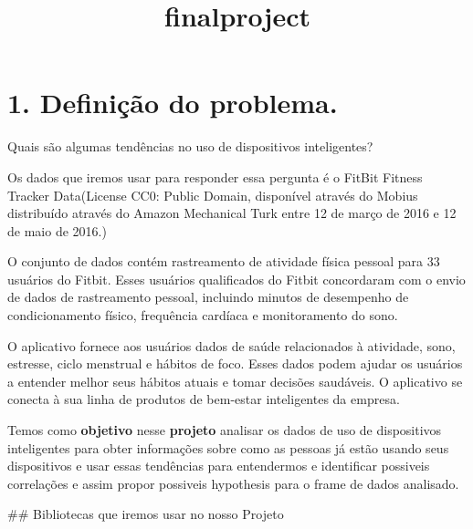 \documentclass[11pt]{article}
\title{finalproject}
\begin{document}
\maketitle
\tableofcontents





\section{1. Definição do problema.}

Quais são algumas tendências no uso de dispositivos inteligentes?

Os dados que iremos usar para responder essa pergunta é o FitBit Fitness
Tracker Data(License CC0: Public Domain, disponível através do Mobius
distribuído através do Amazon Mechanical Turk entre 12 de março de 2016
e 12 de maio de 2016.)

O conjunto de dados contém rastreamento de atividade física pessoal para
33 usuários do Fitbit. Esses usuários qualificados do Fitbit concordaram
com o envio de dados de rastreamento pessoal, incluindo minutos de
desempenho de condicionamento físico, frequência cardíaca e
monitoramento do sono.

O aplicativo fornece aos usuários dados de saúde relacionados à
atividade, sono, estresse, ciclo menstrual e hábitos de foco. Esses
dados podem ajudar os usuários a entender melhor seus hábitos atuais e
tomar decisões saudáveis. O aplicativo se conecta à sua linha de
produtos de bem-estar inteligentes da empresa.

Temos como \textbf{objetivo} nesse \textbf{projeto} analisar os dados de
uso de dispositivos inteligentes para obter informações sobre como as
pessoas já estão usando seus dispositivos e usar essas tendências para
entendermos e identificar possiveis correlações e assim propor possiveis
hypothesis para o frame de dados analisado.

\#\# Bibliotecas que iremos usar no nosso Projeto
\end{document}
